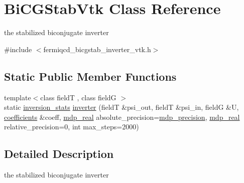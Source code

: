 \hypertarget{class_bi_c_g_stab_vtk}{}\section{Bi\+C\+G\+Stab\+Vtk Class Reference}
\label{class_bi_c_g_stab_vtk}


the stabilized biconjugate inverter  




{\ttfamily \#include $<$fermiqcd\+\_\+bicgstab\+\_\+inverter\+\_\+vtk.\+h$>$}

\subsection*{Static Public Member Functions}
\begin{DoxyCompactItemize}
\item 
{\footnotesize template$<$class fieldT , class fieldG $>$ }\\static \hyperlink{classinversion__stats}{inversion\+\_\+stats} \hyperlink{class_bi_c_g_stab_vtk_aa392e106975304b7ee1b79fb072056b2}{inverter} (fieldT \&psi\+\_\+out, fieldT \&psi\+\_\+in, fieldG \&U, \hyperlink{classcoefficients}{coefficients} \&coeff, \hyperlink{mdp__global__vars_8h_a69d96b74c791e0bbdb888b3913a69450}{mdp\+\_\+real} absolute\+\_\+precision=\hyperlink{mdp__global__vars_8h_a443a4ca745298420893e113a7ac926a9}{mdp\+\_\+precision}, \hyperlink{mdp__global__vars_8h_a69d96b74c791e0bbdb888b3913a69450}{mdp\+\_\+real} relative\+\_\+precision=0, int max\+\_\+steps=2000)
\end{DoxyCompactItemize}


\subsection{Detailed Description}
the stabilized biconjugate inverter 

